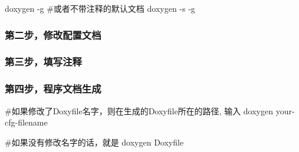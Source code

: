 
\begin{DoxyCode}
doxygen -g
#或者不带注释的默认文档
doxygen -s -g
\end{DoxyCode}


\subsubsection*{第二步，修改配置文档}

\subsubsection*{第三步，填写注释}

\subsubsection*{第四步，程序文档生成}


\begin{DoxyCode}
#如果修改了Doxyfile名字，则在生成的Doxyfile所在的路径, 输入
doxygen your-cfg-filename

#如果没有修改名字的话，就是
doxygen Doxyfile
\end{DoxyCode}
 